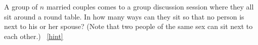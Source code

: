 \documentclass{book}
\begin{document}
\setcounter{project}{226}
\addtocounter{project}{-1}
\begin{activity}[]\label{relaxedmenage}
\hypertarget{p-1249}{}%
A group of \(n\) married couples comes to a group discussion session where they all sit around a round table. In how many ways can they sit so that no person is next to his or her spouse? (Note that two people of the same sex can sit next to each other.)%
~\hfill{\tiny\hyperlink{a-226}{[hint]}\hypertarget{q-226}{}}\end{activity}
\end{document}
